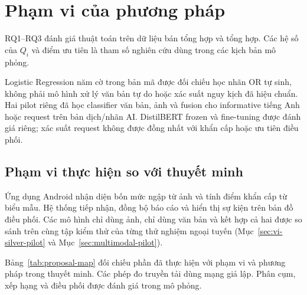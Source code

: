 \section{Phạm vi của phương pháp}\label{sec:02-scope}
RQ1--RQ3 đánh giá thuật toán trên dữ liệu bán tổng hợp và tổng hợp. Các hệ số của $Q_i$ và điểm ưu tiên là tham số nghiên cứu dùng trong các kịch bản mô phỏng.

Logistic Regression năm cờ trong bản mã được đối chiếu học nhãn OR tự sinh, không phải mô hình xử lý văn bản tự do hoặc xác suất nguy kịch đã hiệu chuẩn. Hai pilot riêng đã học classifier văn bản, ảnh và fusion cho informative tiếng Anh hoặc request trên bản dịch/nhãn AI. DistilBERT frozen và fine-tuning được đánh giá riêng; xác suất request không được đồng nhất với khẩn cấp hoặc ưu tiên điều phối.

\subsection{Phạm vi thực hiện so với thuyết minh}\label{sec:mobile-integration-status}
Ứng dụng Android nhận diện bốn mức ngập từ ảnh và tính điểm khẩn cấp từ biểu mẫu. Hệ thống tiếp nhận, đồng bộ báo cáo và hiển thị sự kiện trên bản đồ điều phối. Các mô hình chỉ dùng ảnh, chỉ dùng văn bản và kết hợp cả hai được so sánh trên cùng tập kiểm thử của từng thử nghiệm ngoại tuyến (Mục~\ref{sec:vi-silver-pilot} và Mục~\ref{sec:multimodal-pilot}).

Bảng~\ref{tab:proposal-map} đối chiếu phần đã thực hiện với phạm vi và phương pháp trong thuyết minh. Các phép đo truyền tải dùng mạng giả lập. Phân cụm, xếp hạng và điều phối được đánh giá trong mô phỏng.

